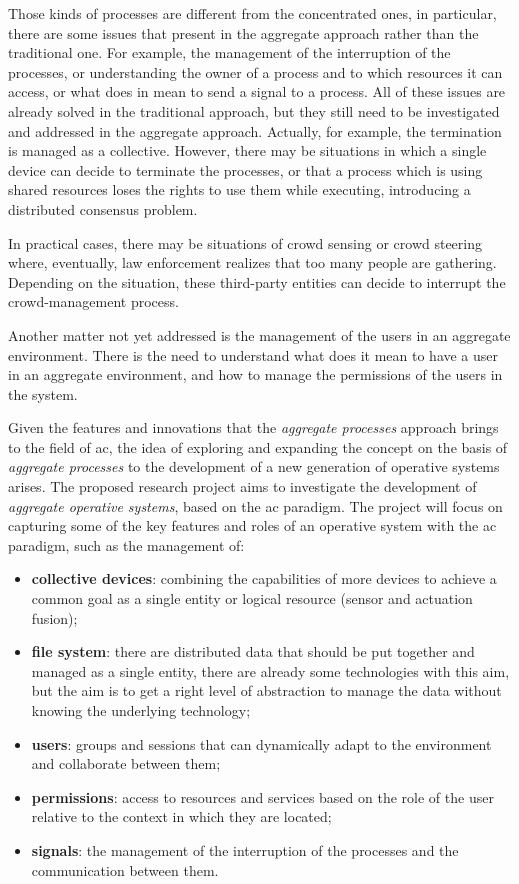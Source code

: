 \documentclass[12pt, a4paper]{article}
\begin{document}
Those kinds of processes are different from the concentrated ones,
in particular,
there are some issues that present in the aggregate approach rather than the traditional one.
%
For example,
the management of the interruption of the processes,
or understanding the owner of a process and to which resources it can access,
or what does in mean to send a signal to a process.
%
All of these issues are already solved in the traditional approach,
but they still need to be investigated and addressed in the aggregate approach.
%
Actually, for example,
the termination is managed as a collective.
%
However,
there may be situations in which a single device can decide to terminate the processes,
or that a process which is using shared resources loses the rights to use them while executing,
introducing a distributed consensus problem.

In practical cases, there may be situations of crowd sensing or crowd steering where,
eventually,
law enforcement realizes that too many people are gathering.
%
Depending on the situation,
these third-party entities can decide to interrupt the crowd-management process.

Another matter not yet addressed is the management of the users in an aggregate environment.
%
There is the need to understand what does it mean to have a user in an aggregate environment,
and how to manage the permissions of the users in the system.

Given the features and innovations that the \emph{aggregate processes} approach brings to the field of \ac{ac},
the idea of exploring and expanding the concept on the basis of \emph{aggregate processes} to the development
of a new generation of operative systems arises.
%
The proposed research project aims to investigate the development of \emph{aggregate operative systems},
based on the \ac{ac} paradigm.
%
The project will focus on capturing some of the key features and roles of an operative system with the \ac{ac} paradigm,
such as the management of:
\begin{itemize}
    \item \textbf{collective devices}: combining the capabilities of more devices to achieve a common goal as a single
        entity or logical resource (sensor and actuation fusion);
    \item \textbf{file system}: there are distributed data that should be put together and managed as a single entity,
        there are already some technologies with this aim, but the aim is to get a right level of abstraction to manage the data
        without knowing the underlying technology;
    \item \textbf{users}: groups and sessions that can dynamically adapt to the environment and collaborate between them;
    \item \textbf{permissions}: access to resources and services based on the role of the user relative to the context in which they are located;
    \item \textbf{signals}: the management of the interruption of the processes and the communication between them.
\end{itemize}
\end{document}
